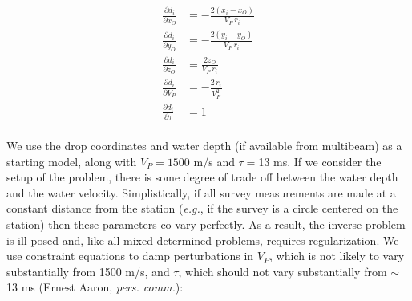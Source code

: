 \begin{align*}
\frac{\partial d_i}{\partial x_O} &= 
	-\frac{2 (x_i - x_O)}{V_P \, r_i}\\
\frac{\partial d_i}{\partial y_O} &= 
	-\frac{2 (y_i - y_O)}{V_P \, r_i} \\
\frac{\partial d_i}{\partial z_O} &= 
	\frac{2 z_O}{V_P \, r_i} \\	
\frac{\partial d_i}{\partial V_P} &= 
	-\frac{2 \, r_i}{V_P^2} \\	
\frac{\partial d_i}{\partial \tau} &= 1\\	
\end{align*}

We use the drop coordinates and water depth (if available from multibeam) as a starting model, along with $V_P = 1500$ m/s and $\tau =$13 ms. If we consider the setup of the problem, there is some degree of trade off between the water depth and the water velocity. Simplistically, if all survey measurements are made at a constant distance from the station (\textit{e.g.}, if the survey is a circle centered on the station) then these parameters co-vary perfectly. As a result, the inverse problem is ill-posed and, like all mixed-determined problems, requires regularization. We use constraint equations to damp perturbations in $V_P$, which is not likely to vary substantially from 1500 m/s, and $\tau$, which should not vary substantially from $\sim$13 ms (Ernest Aaron, \textit{pers. comm.}):

